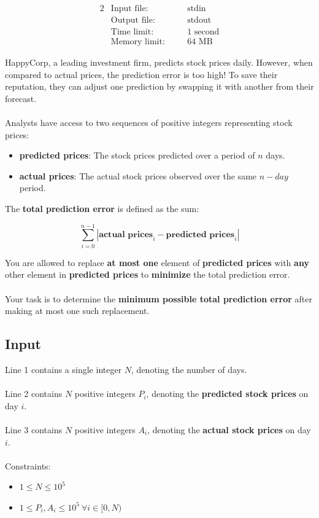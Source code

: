 \documentclass[12pt,a4paper]{article}
\begin{document}
\begin{alignat*} {2}
 &   \text{Input file:}   \quad     &&\text{stdin}\\
 &   \text{Output file:}  \quad     &&\text{stdout}\\
 &   \text{Time limit:}   \quad     &&\text{1 second}\\
 &   \text{Memory limit:} \quad     &&\text{64 MB}
\end{alignat*}

\noindent
HappyCorp, a leading investment firm, predicts stock prices daily. However, when compared to actual prices, the prediction error is too high! To save their reputation, they can adjust one prediction by swapping it with another from their forecast. 
\\\\
\noindent
Analysts have access to two sequences of positive integers representing stock prices:

\begin{itemize}
    \item \textbf{predicted prices}: The stock prices predicted over a period of $n$ days.
    \item \textbf{actual prices}: The actual stock prices observed over the same $n-day$ period.
\end{itemize}

\noindent 
The \textbf{total prediction error} is defined as the sum:

\[
\sum_{i=0}^{n-1} \left| \textbf{actual prices}_i - \textbf{predicted prices}_i \right|
\]

\noindent You are allowed to replace \textbf{at most one} element of \textbf{predicted prices} with \textbf{any} other element in \textbf{predicted prices} to \textbf{minimize} the total prediction error. 
\\\\
\noindent
Your task is to determine the \textbf{minimum possible total prediction error} after making at most one such replacement.

\subsection*{\fontsize{16}{12}Input}
Line 1 contains a single integer $N$, denoting the number of days. \\\\
Line 2 contains $N$ positive integers $P_i$, denoting the \textbf{predicted stock prices} on day $i$. \\\\
Line 3 contains $N$ positive integers $A_i$, denoting the \textbf{actual stock prices} on day $i$.
\\\\
\noindent Constraints:
\begin{itemize}
    \item \( 1 \leq N \leq 10^5 \)
    \item \( 1 \leq P_i, A_i \leq 10^5\ \forall i \in [0, N)\)
\end{itemize}
\end{document}
